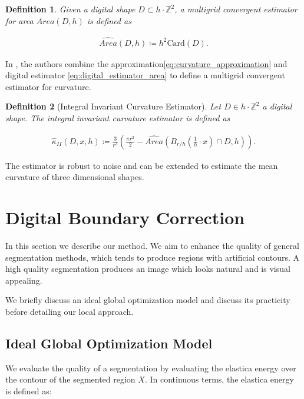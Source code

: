 \documentclass[runningheads]{llncs}
\newtheorem{ddef}{Definition}
\begin{document}
	\begin{ddef}	
		Given a digital shape $D \subset h \cdot \mathbb{Z}^2$, a multigrid convergent estimator for area $\widehat{Area}(D,h)$ is defined as	
		
		\begin{align}
			\widehat{Area}(D,h) \coloneqq h^2\text{Card}\left( D \right).			
			\label{eq:digital_estimator_area}
		\end{align}

	\end{ddef}
	
	In \cite{coeurjolly13}, the authors combine the approximation\eqref{eq:curvature_approximation} and digital estimator \eqref{eq:digital_estimator_area} to define a multigrid convergent estimator for curvature.

	\begin{ddef}[Integral Invariant Curvature Estimator]
		Let $D \in h \cdot \mathbb{Z}^2$ a digital shape. The integral invariant curvature estimator is defined as
		
		\begin{align*}
			\hat{\kappa}_{II}(D,x,h) \coloneqq \frac{3}{r^3} \left( \frac{\pi r^2}{2} - \widehat{Area} \left( B_{r/h} ( \frac{1}{h} \cdot x ) \cap D, h \right) \right).
		\end{align*}
	\end{ddef}
	

	The estimator is robust to noise and can be extended to estimate the mean curvature of three dimensional shapes.
	

\section{Digital Boundary Correction}

In this section we describe our method. We aim to enhance the quality of general segmentation methods, which tends to produce regions with artificial contours. A high quality segmentation produces an image which looks natural and is visual appealing. 

We briefly discuss an ideal global optimization model and discuss its practicity before detailing our local approach.


\subsection{Ideal Global Optimization Model}

We evaluate the quality of a segmentation by evaluating the elastica energy over the contour of the segmented region $X$. In continuous terms, the elastica energy is defined as:
\end{document}
